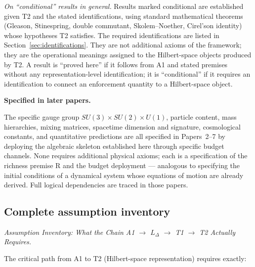 \documentclass[11pt]{article}
\theoremstyle{remark}
\begin{document}
\smallskip\noindent\textit{On ``conditional'' results in general.}  Results marked conditional are established given T2 and the stated identifications, using standard mathematical theorems (Gleason, Stinespring, double commutant, Skolem--Noether, Cirel'son identity) whose hypotheses T2 satisfies.  The required identifications are listed in Section~\ref{sec:identifications}.  They are not additional axioms of the framework; they are the operational meanings assigned to the Hilbert-space objects produced by T2.  A result is ``proved here'' if it follows from A1 and stated premises without any representation-level identification; it is ``conditional'' if it requires an identification to connect an enforcement quantity to a Hilbert-space object.

\smallskip\noindent\textbf{Specified in later papers.}
\label{sec:deferred}

The specific gauge group $SU(3)\times SU(2)\times U(1)$, particle content, mass hierarchies, mixing matrices, spacetime dimension and signature, cosmological constants, and quantitative predictions are all specified in Papers~2--7 by deploying the algebraic skeleton established here through specific budget channels.  None requires additional physical axioms; each is a specification of the richness premise R and the budget deployment --- analogous to specifying the initial conditions of a dynamical system whose equations of motion are already derived.  Full logical dependencies are traced in those papers.

\subsection{Complete assumption inventory}
\label{sec:assumption_inventory}


\medskip\noindent\textit{Assumption Inventory: What the Chain A1 $\to$ $L_\Delta$ $\to$ T1 $\to$ T2 Actually Requires.}
\label{box:assumption_inventory}

The critical path from A1 to T2 (Hilbert-space representation) requires exactly:
\end{document}
